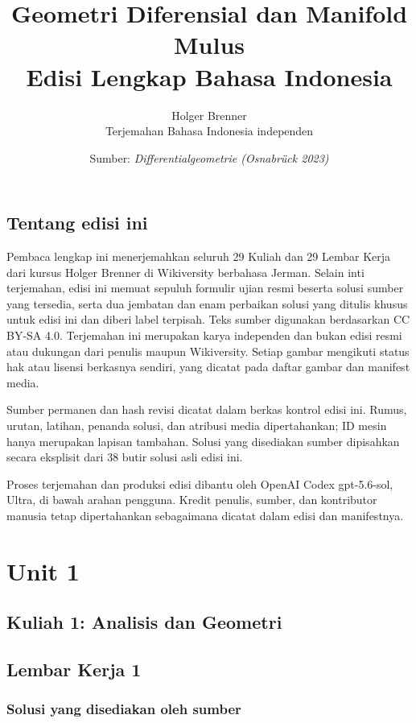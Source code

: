 \documentclass[11pt,a4paper,oneside]{book}
\title{Geometri Diferensial dan Manifold Mulus\\\large Edisi Lengkap Bahasa Indonesia}
\author{Holger Brenner\\Terjemahan Bahasa Indonesia independen}
\date{Sumber: \textit{Differentialgeometrie (Osnabrück 2023)}}
\begin{document}
\hypersetup{pageanchor=false}
\maketitle
\hypersetup{pageanchor=true}
\frontmatter
\chapter*{Tentang edisi ini}
Pembaca lengkap ini menerjemahkan seluruh 29 Kuliah dan 29 Lembar Kerja dari kursus Holger Brenner di Wikiversity berbahasa Jerman. Selain inti terjemahan, edisi ini memuat sepuluh formulir ujian resmi beserta solusi sumber yang tersedia, serta dua jembatan dan enam perbaikan solusi yang ditulis khusus untuk edisi ini dan diberi label terpisah. Teks sumber digunakan berdasarkan CC BY-SA 4.0. Terjemahan ini merupakan karya independen dan bukan edisi resmi atau dukungan dari penulis maupun Wikiversity. Setiap gambar mengikuti status hak atau lisensi berkasnya sendiri, yang dicatat pada daftar gambar dan manifest media.

Sumber permanen dan hash revisi dicatat dalam berkas kontrol edisi ini. Rumus, urutan, latihan, penanda solusi, dan atribusi media dipertahankan; ID mesin hanya merupakan lapisan tambahan. Solusi yang disediakan sumber dipisahkan secara eksplisit dari 38 butir solusi asli edisi ini.

Proses terjemahan dan produksi edisi dibantu oleh OpenAI Codex gpt-5.6-sol, Ultra, di bawah arahan pengguna. Kredit penulis, sumber, dan kontributor manusia tetap dipertahankan sebagaimana dicatat dalam edisi dan manifestnya.
\tableofcontents

\mainmatter
\part{Unit 1}
\chapter[Kuliah 1]{Kuliah 1: Analisis dan Geometri}


\chapter{Lembar Kerja 1}


\section*{Solusi yang disediakan oleh sumber}

\end{document}
